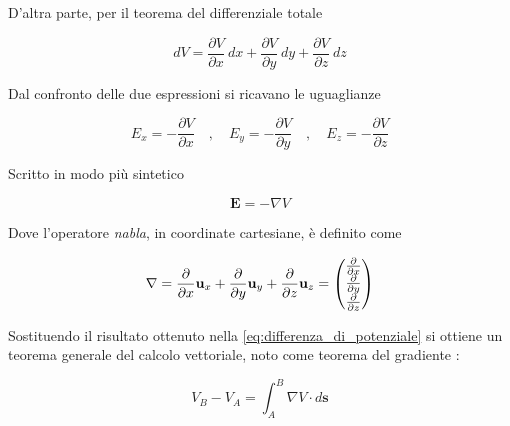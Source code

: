 D'altra parte, per il teorema del differenziale totale

\begin{equation*}
    dV = \frac{\partial V}{\partial x} \ dx + \frac{\partial V}{\partial y} \ dy + \frac{\partial V}{\partial z} \ dz
\end{equation*}

Dal confronto delle due espressioni si ricavano le uguaglianze

\begin{equation*}
    E_x = - \frac{\partial V}{\partial x} \quad, \quad E_y = - \frac{\partial V}{\partial y} \quad, \quad E_z = - \frac{\partial V}{\partial z} 
\end{equation*}

\newpage

Scritto in modo più sintetico 

\begin{tcolorbox}[colback=yellow!10!white, colframe=orange!70!black, boxrule=0.8pt]
\begin{equation}
    \mathbf{E} = - \nabla V
    \label{eq:Campoelettrostatico_come_gradiente}
\end{equation}
\end{tcolorbox}

Dove l'operatore \emph{nabla},  in coordinate cartesiane, è definito come

\begin{equation}
    \mathbf{\nabla } = \frac{\partial}{\partial x} \mathbf{u}_x + \frac{\partial}{\partial y} \mathbf{u}_y + \frac{\partial}{\partial z} \mathbf{u}_z = \begin{pmatrix} \frac{\partial}{\partial x} \\ \frac{\partial}{\partial y} \\ \frac{\partial}{\partial z} \end{pmatrix}
\end{equation}

Sostituendo il risultato ottenuto nella \ref{eq:differenza_di_potenziale}
si ottiene un teorema generale del calcolo vettoriale, noto come teorema del gradiente :

\begin{tcolorbox}[colback=yellow!10!white, colframe=orange!70!black, boxrule=0.8pt]
\begin{equation}
    V_B - V_A = \int_A^B \nabla V \cdot d \mathbf{s}
    \label{thrm:teorema_del_gradiente}
\end{equation}
\end{tcolorbox}

